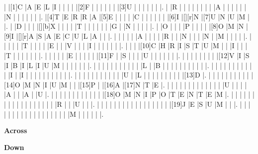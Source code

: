 \documentclass[12pt,a4paper]{article}
\begin{document}
\begin{Puzzle}{24}{19}
|{} |[1]C |A |E |L |I |{} |{} |{} |{} |[2]F |{} |{} |{} |{} |{} |{} |[3]U |{} |{} |{} |{} |{} |{} |.
|{} |R |{} |{} |{} |{} |{} |{} |{} |{} |A |{} |{} |{} |{} |{} |{} |N |{} |{} |{} |{} |{} |{} |.
|[4]T |E |R |R |A |[5]E |{} |{} |{} |{} |C |{} |{} |{} |{} |{} |{} |[6]I |[][r]N |[7]U |N |U |M |{} |.
|{} |D |{} |{} |{} |[][b]X |{} |{} |{} |{} |T |{} |{} |{} |{} |{} |{} |G |{} |N |{} |{} |{} |{} |.
|{} |O |{} |{} |{} |P |{} |{} |{} |{} |[8]O |M |N |[9]I |[][r]A |S |A |E |C |U |L |A |{} |{} |.
|{} |{} |{} |{} |{} |A |{} |{} |{} |{} |R |{} |{} |N |{} |{} |{} |N |{} |M |{} |{} |{} |{} |.
|{} |{} |{} |{} |{} |T |{} |{} |{} |{} |E |{} |{} |V |{} |{} |{} |I |{} |{} |{} |{} |{} |{} |.
|{} |{} |{} |[10]C |H |R |I |S |T |U |M |{} |{} |I |{} |{} |{} |T |{} |{} |{} |{} |{} |{} |.
|{} |{} |{} |{} |{} |E |{} |{} |{} |{} |{} |[11]F |{} |S |{} |{} |{} |U |{} |{} |{} |{} |{} |{} |.
|{} |{} |{} |{} |{} |{} |{} |{} |[12]V |I |S |I |B |I |L |I |U |M |{} |{} |{} |{} |{} |{} |.
|{} |{} |{} |{} |{} |{} |{} |{} |{} |{} |{} |L |{} |B |{} |{} |{} |{} |{} |{} |{} |{} |{} |{} |.
|{} |{} |{} |{} |{} |{} |{} |{} |{} |{} |{} |I |{} |I |{} |{} |{} |{} |{} |{} |{} |{} |{} |{} |.
|{} |{} |{} |{} |{} |{} |{} |{} |{} |{} |{} |U |{} |L |{} |{} |{} |{} |{} |{} |{} |{} |{} |[13]D |.
|{} |{} |{} |{} |{} |{} |{} |{} |{} |{} |[14]O |M |N |I |U |M |{} |{} |[15]P |{} |[16]A |[17]N |T |E |.
|{} |{} |{} |{} |{} |{} |{} |{} |{} |{} |{} |{} |{} |U |{} |{} |{} |{} |A |{} |{} |A |{} |U |.
|{} |{} |{} |{} |{} |{} |{} |{} |{} |{} |{} |{} |[18]O |M |N |I |P |O |T |E |N |T |E |M |.
|{} |{} |{} |{} |{} |{} |{} |{} |{} |{} |{} |{} |{} |{} |{} |{} |{} |{} |R |{} |{} |U |{} |{} |.
|{} |{} |{} |{} |{} |{} |{} |{} |{} |{} |{} |{} |{} |{} |{} |{} |{} |[19]J |E |S |U |M |{} |{} |.
|{} |{} |{} |{} |{} |{} |{} |{} |{} |{} |{} |{} |{} |{} |{} |{} |{} |{} |M |{} |{} |{} |{} |{} |.
\end{Puzzle}

\begin{PuzzleClues}{\textbf{Across}}
\end{PuzzleClues}%
\begin{PuzzleClues}{\textbf{Down}}
\end{PuzzleClues}
\end{document}
